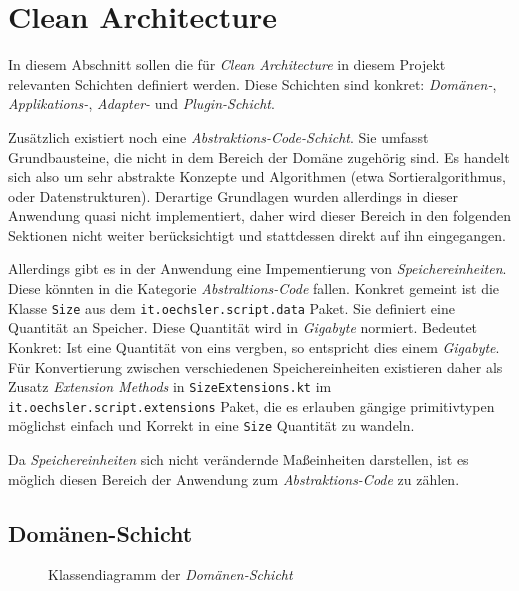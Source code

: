 \section{Clean Architecture}
\label{sec:clean_architecture}

In diesem Abschnitt sollen die für \emph{Clean Architecture} in diesem Projekt relevanten Schichten definiert werden.
Diese Schichten sind konkret: \emph{Domänen-}, \emph{Applikations-}, \emph{Adapter-} und \emph{Plugin-Schicht}.

Zusätzlich existiert noch eine \emph{Abstraktions-Code-Schicht}.
Sie umfasst Grundbausteine, die nicht in dem Bereich der Domäne zugehörig sind.
Es handelt sich also um sehr abstrakte Konzepte und Algorithmen (etwa Sortieralgorithmus, oder Datenstrukturen).
Derartige Grundlagen wurden allerdings in dieser Anwendung quasi nicht implementiert, daher wird dieser Bereich in den folgenden Sektionen nicht weiter berücksichtigt und stattdessen direkt auf ihn eingegangen.

Allerdings gibt es in der Anwendung eine Impementierung von \emph{Speichereinheiten}.
Diese könnten in die Kategorie \emph{Abstraltions-Code} fallen.
Konkret gemeint ist die Klasse \texttt{Size} aus dem \texttt{it.oechsler.script.data} Paket.
Sie definiert eine Quantität an Speicher.
Diese Quantität wird in \emph{Gigabyte} normiert.
Bedeutet Konkret: Ist eine Quantität von eins vergben, so entspricht dies einem \emph{Gigabyte}.
Für Konvertierung zwischen verschiedenen Speichereinheiten existieren daher als Zusatz \emph{Extension Methods} in \texttt{SizeExtensions.kt} im \texttt{it.oechsler.script.extensions} Paket, die es erlauben gängige primitivtypen möglichst einfach und Korrekt in eine \texttt{Size} Quantität zu wandeln.

Da \emph{Speichereinheiten} sich nicht verändernde Maßeinheiten darstellen, ist es möglich diesen Bereich der Anwendung zum \emph{Abstraktions-Code} zu zählen.

\subsection{Domänen-Schicht}
\label{subsec:domaenen_schicht}

\begin{figure}[ht]
    \centering


    \caption{Klassendiagramm der \emph{Domänen-Schicht}}
    \label{fig:domain}
\end{figure}

